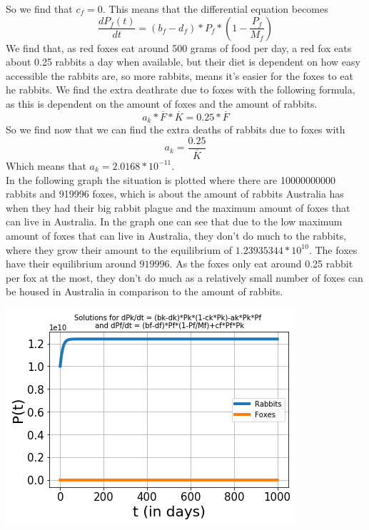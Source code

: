 \documentclass{article}
\begin{document}
So we find that $c_f=0$. This means that the differential equation becomes 
$$\frac{dP_f(t)}{dt}=(b_f-d_f)*P_f*(1-\frac{P_f}{M_f})$$
We find that, as red foxes eat around 500 grams of food per day, a red fox eats about 0.25 rabbits a day when available, but their diet is dependent on how easy accessible the rabbits are, so more rabbits, means it's easier for the foxes to eat he rabbits. We find the extra deathrate due to foxes with the following formula, as this is dependent on the amount of foxes and the amount of rabbits.
$$a_k*\overline{F}*\overline{K}=0.25*\overline{F}$$
So we find now that we can find the extra deaths of rabbits due to foxes with
$$a_k=\frac{0.25}{\overline{K}}$$
Which means that $a_k=2.0168*10^{-11}$.
\\In the following graph the situation is plotted where there are 10000000000 rabbits and 919996 foxes, which is about the amount of rabbits Australia has when they had their big rabbit plague and the maximum amount of foxes that can live in Australia. In the graph one can see that due to the low maximum amount of foxes that can live in Australia, they don't do much to the rabbits, where they grow their amount to the equilibrium of $1.23935344*10^10$. The foxes have their equilibrium around $919996$. As the foxes only eat around 0.25 rabbit per fox at the most, they don't do much as a relatively small number of foxes can be housed in Australia in comparison to the amount of rabbits. 
\begin{center}
    \includegraphics[scale=0.78]{Pictures/RabbitFoxes.png}
\end{center}
\end{document}
